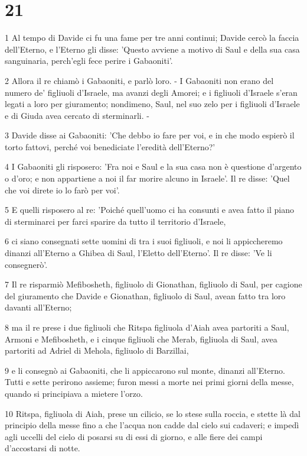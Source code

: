 \chapter{21}

\par 1 Al tempo di Davide ci fu una fame per tre anni continui; Davide cercò la faccia dell'Eterno, e l'Eterno gli disse: 'Questo avviene a motivo di Saul e della sua casa sanguinaria, perch'egli fece perire i Gabaoniti'.
\par 2 Allora il re chiamò i Gabaoniti, e parlò loro. - I Gabaoniti non erano del numero de' figliuoli d'Israele, ma avanzi degli Amorei; e i figliuoli d'Israele s'eran legati a loro per giuramento; nondimeno, Saul, nel suo zelo per i figliuoli d'Israele e di Giuda avea cercato di sterminarli. -
\par 3 Davide disse ai Gabaoniti: 'Che debbo io fare per voi, e in che modo espierò il torto fattovi, perché voi benediciate l'eredità dell'Eterno?'
\par 4 I Gabaoniti gli risposero: 'Fra noi e Saul e la sua casa non è questione d'argento o d'oro; e non appartiene a noi il far morire alcuno in Israele'. Il re disse: 'Quel che voi direte io lo farò per voi'.
\par 5 E quelli risposero al re: 'Poiché quell'uomo ci ha consunti e avea fatto il piano di sterminarci per farci sparire da tutto il territorio d'Israele,
\par 6 ci siano consegnati sette uomini di tra i suoi figliuoli, e noi li appiccheremo dinanzi all'Eterno a Ghibea di Saul, l'Eletto dell'Eterno'. Il re disse: 'Ve li consegnerò'.
\par 7 Il re risparmiò Mefibosheth, figliuolo di Gionathan, figliuolo di Saul, per cagione del giuramento che Davide e Gionathan, figliuolo di Saul, avean fatto tra loro davanti all'Eterno;
\par 8 ma il re prese i due figliuoli che Ritspa figliuola d'Aiah avea partoriti a Saul, Armoni e Mefibosheth, e i cinque figliuoli che Merab, figliuola di Saul, avea partoriti ad Adriel di Mehola, figliuolo di Barzillai,
\par 9 e li consegnò ai Gabaoniti, che li appiccarono sul monte, dinanzi all'Eterno. Tutti e sette perirono assieme; furon messi a morte nei primi giorni della messe, quando si principiava a mietere l'orzo.
\par 10 Ritspa, figliuola di Aiah, prese un cilicio, se lo stese sulla roccia, e stette là dal principio della messe fino a che l'acqua non cadde dal cielo sui cadaveri; e impedì agli uccelli del cielo di posarsi su di essi di giorno, e alle fiere dei campi d'accostarsi di notte.
